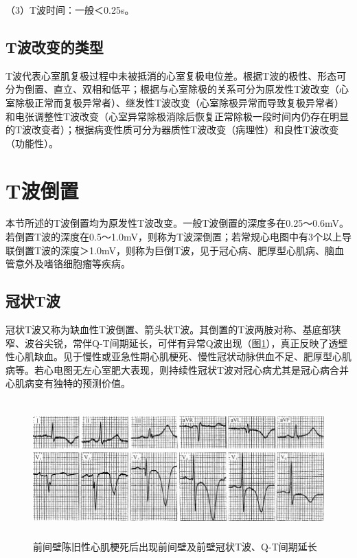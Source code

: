 （3）T波时间：一般＜0.25s。

\protect\hypertarget{text00012.htmlux5cux23subid86}{}{}

\subsection{T波改变的类型}

T波代表心室肌复极过程中未被抵消的心室复极电位差。根据T波的极性、形态可分为倒置、直立、双相和低平；根据与心室除极的关系可分为原发性T波改变（心室除极正常而复极异常者）、继发性T波改变（心室除极异常而导致复极异常者）和电张调整性T波改变（心室异常除极消除后恢复正常除极一段时间内仍存在明显的T波改变者）；根据病变性质可分为器质性T波改变（病理性）和良性T波改变（功能性）。

\protect\hypertarget{text00012.htmlux5cux23subid87}{}{}

\section{T波倒置}

本节所述的T波倒置均为原发性T波改变。一般T波倒置的深度多在0.25～0.6mV。若倒置T波的深度在0.5～1.0mV，则称为T波深倒置；若常规心电图中有3个以上导联倒置T波的深度＞1.0mV，则称为巨倒T波，见于冠心病、肥厚型心肌病、脑血管意外及嗜铬细胞瘤等疾病。

\protect\hypertarget{text00012.htmlux5cux23subid88}{}{}

\subsection{冠状T波}

冠状T波又称为缺血性T波倒置、箭头状T波。其倒置的T波两肢对称、基底部狭窄、波谷尖锐，常伴Q-T间期延长，可伴有异常Q波出现（图\ref{fig6-1}），真正反映了透壁性心肌缺血。见于慢性或亚急性期心肌梗死、慢性冠状动脉供血不足、肥厚型心肌病等。若心电图无左心室肥大表现，则持续性冠状T波对冠心病尤其是冠心病合并心肌病变有独特的预测价值。

\begin{figure}[!htbp]
 \centering
 \includegraphics[width=5.78125in,height=2.07292in]{./images/Image00093.jpg}
 \captionsetup{justification=centering}
 \caption{前间壁陈旧性心肌梗死后出现前间壁及前壁冠状T波、Q-T间期延长}
 \label{fig6-1}
  \end{figure} 

